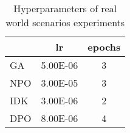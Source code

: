 \begin{table}[h]
    \centering
    \begin{tabular}{lcc}
        \hline
        & \textbf{lr} & \textbf{epochs} \\
        \hline
        GA  & 5.00E-06 & 3 \\
        NPO & 3.00E-05 & 3 \\
        IDK & 3.00E-06 & 2 \\
        DPO & 8.00E-06 & 4 \\
        \hline
    \end{tabular}
    \caption{Hyperparameters of real world scenarios experiments}
    \label{tab:hyperparams-realworld}
\end{table}